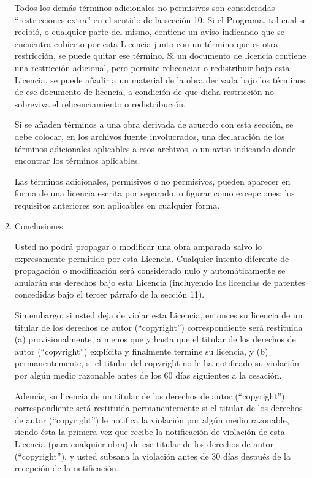\documentclass[11pt]{article}
\begin{document}
\begin{enumerate}
Todos los dem\'{a}s t\'{e}rminos adicionales no permisivos son consideradas 
``restricciones extra'' en el sentido de la secci\'{o}n 10.  Si el Programa, tal cual se 
recibi\'{o}, o cualquier parte del mismo, contiene un aviso indicando que se 
encuentra cubierto por esta Licencia junto con un t\'{e}rmino que es otra restricci\'{o}n,
se puede quitar ese t\'{e}rmino.  Si un documento de licencia contiene una restricci\'{o}n
adicional, pero permite relicenciar o redistribuir bajo esta Licencia, se puede 
a\~nadir a un material de la obra derivada bajo los t\'{e}rminos de ese documento de 
licencia, a condici\'{o}n de que dicha restricci\'{o}n no sobreviva el relicenciamiento 
o redistribuci\'{o}n.

Si se a\~naden t\'{e}rminos a una obra derivada de acuerdo con esta secci\'{o}n, se debe 
colocar, en los archivos fuente involucrados, una declaraci\'{o}n de los t\'{e}rminos adicionales aplicables a esos archivos, o un aviso indicando donde encontrar los t\'{e}rminos aplicables.

Las t\'{e}rminos adicionales, permisivos o no permisivos, pueden aparecer en forma de 
una licencia escrita por separado, o figurar como excepciones; los requisitos anteriores son aplicables en cualquier forma.

\item Conclusiones.

Usted no podr\'{a} propagar o modificar una obra amparada salvo lo
expresamente permitido por esta Licencia.  Cualquier intento
diferente de propagaci\'{o}n o modificaci\'{o}n ser\'{a} considerado nulo y
autom\'{a}ticamente se anular\'{a}n sus derechos bajo esta Licencia
(incluyendo las licencias de patentes concedidas bajo el tercer
p\'{a}rrafo de la secci\'{o}n 11).

Sin embargo, si usted deja de violar esta Licencia, entonces su
licencia de un titular de los derechos de autor (``copyright'') correspondiente ser\'{a}
restituida (a) provisionalmente, a menos que y hasta que el titular de los derechos de autor (``copyright'') expl\'{i}cita y finalmente termine su licencia, y (b) permanentemente,
si el titular del copyright no le ha notificado su violaci\'{o}n por
alg\'{u}n medio razonable antes de los 60 d\'{i}as siguientes a la cesaci\'{o}n.

Adem\'{a}s, su licencia de un titular de los derechos de autor (``copyright'')
correspondiente ser\'{a} restituida permanentemente si el titular de los derechos de autor (``copyright'') le notifica la violaci\'{o}n por alg\'{u}n medio razonable,
siendo \'{e}sta la primera vez que recibe la notificaci\'{o}n de violaci\'{o}n de
esta Licencia (para cualquier obra) de ese titular de los derechos de autor (``copyright''), y
usted subsana la violaci\'{o}n antes de 30 d\'{i}as despu\'{e}s de la recepci\'{o}n
de la notificaci\'{o}n.


\end{enumerate}
\end{document}
